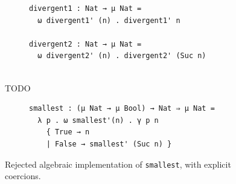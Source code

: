 
\begin{figure}[tb]
  \centering
  \begin{subfigure}[t]{1.0\textwidth}
  \begin{verbatim}
divergent1 : Nat → μ Nat =
  ω divergent1' (n) . divergent1' n

divergent2 : Nat → μ Nat =
  ω divergent2' (n) . divergent2' (Suc n)


  \end{verbatim}
  \end{subfigure}
  \caption{TODO}
  \label{fig:example-rejected}
\end{figure}

\begin{figure}[tb]
  \centering
  \begin{subfigure}[t]{1.0\textwidth}
  \begin{verbatim}
smallest : (μ Nat → μ Bool) → Nat ⇒ μ Nat =
  λ p . ω smallest'(n) . γ p n
    { True → n
    | False → smallest' (Suc n) }
  \end{verbatim}
  \end{subfigure}
  \caption{Rejected algebraic implementation of \texttt{smallest}, with explicit coercions.}
  \label{fig:example-smallest}
\end{figure}